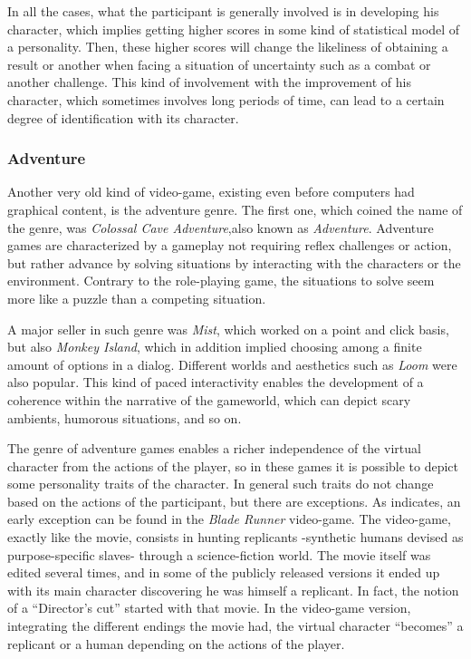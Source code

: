 \documentclass[
		twoside,openright,titlepage,numbers=noenddot,manychapters,
		headinclude,%
                footinclude=false,cleardoublepage=empty,
                BCOR=5mm,
		fontsize=11pt, %
                 enabledeprecatedfontcommands]{scrreprt}
\begin{document}
In all the cases, what the participant is generally involved is in developing his character, which implies getting higher scores in some kind of statistical model of a personality. Then, these higher scores will change the likeliness of obtaining a result or another when facing a situation of uncertainty such as a combat or another challenge. This kind of involvement with the improvement of his character, which sometimes involves long periods of time, can lead to a certain degree of identification with its character.



\subsubsection{Adventure}

Another very old kind of video-game, existing even before computers had graphical content, is the adventure genre. The first one, which coined the name of the genre, was \emph{Colossal Cave Adventure},also known as \emph{Adventure}. Adventure games are characterized by a gameplay not requiring reflex challenges or action, but rather advance by solving situations by interacting with the characters or the environment. Contrary to the role-playing game, the situations to solve seem more like a puzzle than a competing situation.

A major seller in such genre was \emph{Mist}, which worked on a point and click basis, but also  \emph{Monkey Island}, which in addition implied choosing among a finite amount of options in a dialog. Different worlds and aesthetics such as  \emph{Loom} were also popular. This kind of paced interactivity enables the development of a coherence within the narrative of the gameworld, which can depict scary ambients, humorous situations, and so on. 


The genre of adventure games enables a richer independence of the virtual character from the actions of the player, so in these games it is possible to depict some personality traits of the character. In general such traits do not change based on the actions of the participant, but there are exceptions.  As \cite{pearce2002story} indicates, an early exception can be found in the \emph{Blade Runner} video-game. The video-game, exactly like the movie, consists in hunting replicants -synthetic humans devised as purpose-specific slaves- through a science-fiction world. The movie itself was edited several times, and in some of the publicly released versions it ended up with its main character discovering he was himself a replicant.  In fact, the notion of a ``Director's cut'' started with that movie. In the video-game version, integrating the different endings the movie had, the virtual character ``becomes'' a replicant or a human depending on the actions of the player.
\end{document}
